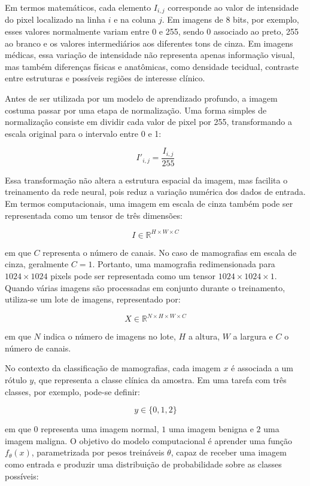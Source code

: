 \documentclass[
    12pt,
    openright,
    oneside,
    a4paper,
    english,
    brazil
]{abntex2}
\begin{document}
Em termos matemáticos, cada elemento \(I_{i,j}\) corresponde ao valor de intensidade do pixel localizado na linha \(i\) e na coluna \(j\). Em imagens de 8 bits, por exemplo, esses valores normalmente variam entre 0 e 255, sendo 0 associado ao preto, 255 ao branco e os valores intermediários aos diferentes tons de cinza. Em imagens médicas, essa variação de intensidade não representa apenas informação visual, mas também diferenças físicas e anatômicas, como densidade tecidual, contraste entre estruturas e possíveis regiões de interesse clínico.

Antes de ser utilizada por um modelo de aprendizado profundo, a imagem costuma passar por uma etapa de normalização. Uma forma simples de normalização consiste em dividir cada valor de pixel por 255, transformando a escala original para o intervalo entre 0 e 1:

\[
I'_{i,j} = \frac{I_{i,j}}{255}
\]

Essa transformação não altera a estrutura espacial da imagem, mas facilita o treinamento da rede neural, pois reduz a variação numérica dos dados de entrada. Em termos computacionais, uma imagem em escala de cinza também pode ser representada como um tensor de três dimensões:

\[
I \in \mathbb{R}^{H \times W \times C}
\]

em que \(C\) representa o número de canais. No caso de mamografias em escala de cinza, geralmente \(C = 1\). Portanto, uma mamografia redimensionada para \(1024 \times 1024\) pixels pode ser representada como um tensor \(1024 \times 1024 \times 1\). Quando várias imagens são processadas em conjunto durante o treinamento, utiliza-se um lote de imagens, representado por:

\[
X \in \mathbb{R}^{N \times H \times W \times C}
\]

em que \(N\) indica o número de imagens no lote, \(H\) a altura, \(W\) a largura e \(C\) o número de canais.

No contexto da classificação de mamografias, cada imagem \(x\) é associada a um rótulo \(y\), que representa a classe clínica da amostra. Em uma tarefa com três classes, por exemplo, pode-se definir:

\[
y \in \{0, 1, 2\}
\]

em que \(0\) representa uma imagem normal, \(1\) uma imagem benigna e \(2\) uma imagem maligna. O objetivo do modelo computacional é aprender uma função \(f_{\theta}(x)\), parametrizada por pesos treináveis \(\theta\), capaz de receber uma imagem como entrada e produzir uma distribuição de probabilidade sobre as classes possíveis:
\end{document}
